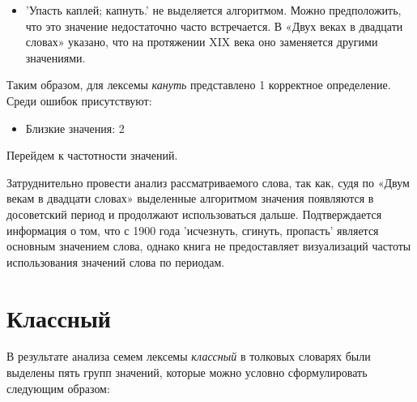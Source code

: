 \begin{itemize}
    \item ’Упасть каплей; капнуть.’ не выделяется алгоритмом.
Можно предположить, что это значение недостаточно часто встречается.
В «Двух веках в двадцати словах» указано, что на протяжении XIX века оно заменяется
другими значениями.
\end{itemize}

Таким образом, для лексемы \textit{кануть} представлено 1 корректное определение.
Среди ошибок присутствуют:
\begin{itemize}
    \item Близкие значения: 2
\end{itemize}

Перейдем к частотности значений.

Затруднительно провести анализ рассматриваемого слова,
так как, судя по «Двум векам в двадцати словах» выделенные алгоритмом значения появляются
в досоветский период и продолжают использоваться дальше.
Подтверждается информация о том, что с 1900 года ’исчезнуть, сгинуть, пропасть’ является
основным значением слова, однако книга не предоставляет визуализаций частоты
использования значений слова по периодам.

\section*{Классный}

В результате анализа семем лексемы \textit{классный} в толковых словарях были выделены пять групп значений,
которые можно условно сформулировать следующим образом:

